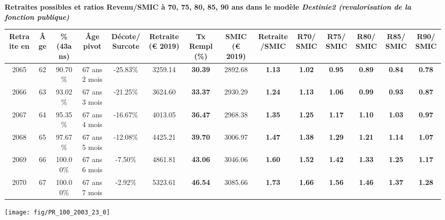  \vspace{0.1cm} 
{\bf \noindent Retraites possibles et ratios Revenu/SMIC à 70, 75, 80, 85, 90 ans dans le modèle \emph{Destinie2 (revalorisation de la fonction publique)}}  
 
\begin{adjustbox}{max width=\textwidth} 
\begin{tabular}[htb]{|c|c||c|c|c||c|c||c|c||c|c|c|c|c|} 
\hline 
 Retraite en &  Âge &  \%(43ans) &  Âge pivot &  Décote/Surcote &  Retraite (\euro{} 2019) &  Tx Rempl(\%) &  SMIC (\euro{} 2019) &  Retraite/SMIC &  R70/SMIC &  R75/SMIC &  R80/SMIC &  R85/SMIC &  R90/SMIC \\ 
\hline \hline 
 2065 &  62 &  90.70\% &  67 ans 2 mois &  -25.83\% &  3259.14 &  {\bf 30.39} &  2892.68 &  {\bf 1.13} &  {\bf 1.02} &  {\bf {\color{red} 0.95}} &  {\bf {\color{red} 0.89}} &  {\bf {\color{red} 0.84}} &  {\bf {\color{red} 0.78}} \\ 
\hline 
 2066 &  63 &  93.02\% &  67 ans 3 mois &  -21.25\% &  3624.60 &  {\bf 33.37} &  2930.29 &  {\bf 1.24} &  {\bf 1.13} &  {\bf 1.06} &  {\bf {\color{red} 0.99}} &  {\bf {\color{red} 0.93}} &  {\bf {\color{red} 0.87}} \\ 
\hline 
 2067 &  64 &  95.35\% &  67 ans 4 mois &  -16.67\% &  4013.05 &  {\bf 36.47} &  2968.38 &  {\bf 1.35} &  {\bf 1.25} &  {\bf 1.17} &  {\bf 1.10} &  {\bf 1.03} &  {\bf {\color{red} 0.97}} \\ 
\hline 
 2068 &  65 &  97.67\% &  67 ans 5 mois &  -12.08\% &  4425.21 &  {\bf 39.70} &  3006.97 &  {\bf 1.47} &  {\bf 1.38} &  {\bf 1.29} &  {\bf 1.21} &  {\bf 1.14} &  {\bf 1.07} \\ 
\hline 
 2069 &  66 &  100.00\% &  67 ans 6 mois &  -7.50\% &  4861.81 &  {\bf 43.06} &  3046.06 &  {\bf 1.60} &  {\bf 1.52} &  {\bf 1.42} &  {\bf 1.33} &  {\bf 1.25} &  {\bf 1.17} \\ 
\hline 
 2070 &  67 &  100.00\% &  67 ans 7 mois &  -2.92\% &  5323.61 &  {\bf 46.54} &  3085.66 &  {\bf 1.73} &  {\bf 1.66} &  {\bf 1.56} &  {\bf 1.46} &  {\bf 1.37} &  {\bf 1.28} \\ 
\hline 
\hline 
\end{tabular} 
\end{adjustbox} 
 
 \vspace{0.1cm} 

 {\hspace{-2.2cm}\texttt{[image: fig/PR\_100\_2003\_23\_0]}} 

\newpage 
 
